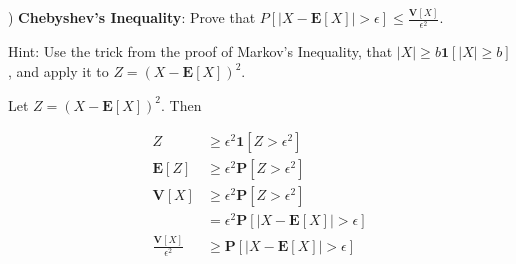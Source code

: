 \documentclass[12pt,english]{article}
\begin{document}
\vspace{1em}
) \textbf{Chebyshev's Inequality}: Prove that $P[\left| X - \mathbf{E}[X] \right| > \epsilon] \leq \frac{\mathbf{V}[X]}{\epsilon^{2}}$.

Hint: Use the trick from the proof of Markov's Inequality, that $|X| \geq b \mathbf{1}[|X| \geq b]$, and apply it to $Z = (X - \mathbf{E}[X])^{2}$.
\vspace{1em}

Let $Z = (X - \mathbf{E}[X])^{2}$. Then

\begin{align*}
Z & \geq \epsilon^{2} \mathbf{1}[Z > \epsilon^{2}] \\
\mathbf{E}[Z] & \geq \epsilon^{2} \mathbf{P}[Z > \epsilon^{2}] \\
\mathbf{V}[X] & \geq \epsilon^{2} \mathbf{P}[Z > \epsilon^{2}] \\
& = \epsilon^{2} \mathbf{P}[|X - \mathbf{E}[X]| > \epsilon] \\
\frac{\mathbf{V}[X]}{\epsilon^{2}} & \geq \mathbf{P}[|X - \mathbf{E}[X]| > \epsilon]
\end{align*}
\end{document}
